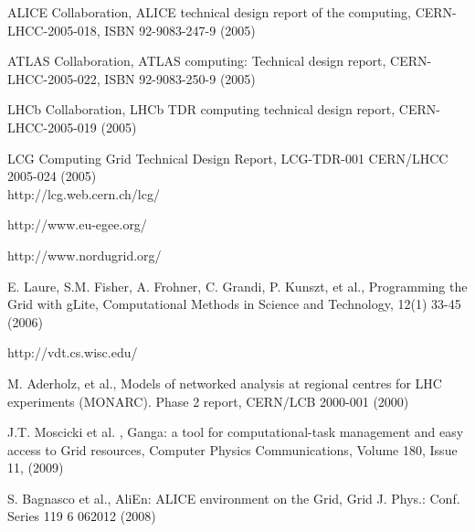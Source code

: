 \begin{thebibliography}{}
ALICE Collaboration, ALICE technical design report of the computing, CERN-LHCC-2005-018, ISBN 92-9083-247-9 (2005)

ATLAS Collaboration, ATLAS computing: Technical design report, CERN-LHCC-2005-022, ISBN 92-9083-250-9 (2005)

 LHCb Collaboration, LHCb TDR computing technical design report, CERN-LHCC-2005-019 (2005)

LCG Computing Grid Technical Design Report, LCG-TDR-001 CERN/LHCC 2005-024 (2005) \\
http://lcg.web.cern.ch/lcg/

http://www.eu-egee.org/

http://www.nordugrid.org/

E. Laure, S.M. Fisher, A. Frohner, C. Grandi, P. Kunszt, et al., Programming the Grid with gLite, Computational Methods in Science and Technology, 12(1) 33-45 (2006)

http://vdt.cs.wisc.edu/

 M. Aderholz, et al., Models of networked analysis at regional centres for LHC experiments (MONARC). Phase 2 report, CERN/LCB 2000-001 (2000)

J.T. Moscicki et al. , Ganga: a tool for computational-task management and easy access to Grid resources, Computer Physics Communications, Volume 180, Issue 11, (2009)

S. Bagnasco et al., AliEn: ALICE environment on the Grid, Grid J. Phys.: Conf. Series 119 6 062012 (2008)

\end{thebibliography}



